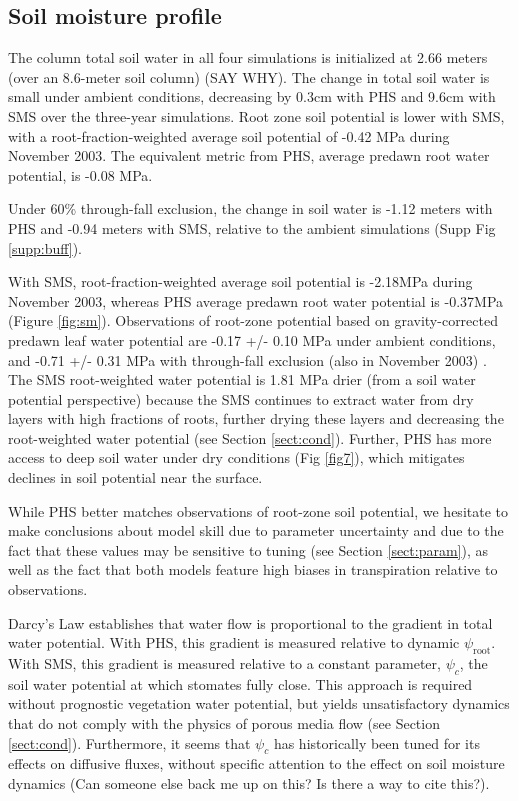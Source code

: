 \documentclass[draft,linenumbers]{agujournal}
\begin{document}
\subsection{Soil moisture profile}

    The column total soil water in all four simulations is initialized at 2.66 meters (over an 8.6-meter soil column) (SAY WHY). The change in total soil water is small under ambient conditions, decreasing by 0.3cm with PHS and 9.6cm with SMS over the three-year simulations. Root zone soil potential is lower with SMS, with a root-fraction-weighted average soil potential of -0.42 MPa during November 2003. The equivalent metric from PHS, average predawn root water potential, is -0.08 MPa. 
    
    Under 60\% through-fall exclusion, the change in soil water is -1.12 meters with PHS and -0.94 meters with SMS, relative to the ambient simulations (Supp Fig \ref{supp:buff}). 
    
    With SMS, root-fraction-weighted average soil potential is -2.18MPa during November 2003, whereas  PHS average predawn root water potential is -0.37MPa (Figure \ref{fig:sm}). Observations of root-zone potential based on gravity-corrected predawn leaf water potential are -0.17 +/- 0.10 MPa under ambient conditions, and -0.71 +/- 0.31 MPa with through-fall exclusion (also in November 2003) \citep{fisher2007}.  The SMS root-weighted water potential is 1.81 MPa drier (from a soil water potential perspective) because the SMS continues to extract water from dry layers with high fractions of roots, further drying these layers and decreasing the root-weighted water potential (see Section \ref{sect:cond}).  Further, PHS has more access to deep soil water under dry conditions (Fig \ref{fig7}), which mitigates declines in soil potential near the surface.
    
    While PHS better matches observations of root-zone soil potential, we hesitate to make conclusions about model skill due to parameter uncertainty and due to the fact that these values may be sensitive to tuning (see Section \ref{sect:param}), as well as the fact that both models feature high biases in transpiration relative to observations.
    
    Darcy's Law establishes that water flow is proportional to the gradient in total water potential. 
    With PHS, this gradient is measured relative to dynamic $\psi_{\text{root}}$.
    With SMS, this gradient is measured relative to a constant parameter, $\psi_c$, the soil water potential at which stomates fully close.
    This approach is required without prognostic vegetation water potential, but yields unsatisfactory dynamics that do not comply with the physics of porous media flow (see Section \ref{sect:cond}).
    Furthermore, it seems that $\psi_c$ has historically been tuned for its effects on diffusive fluxes, without specific attention to the effect on soil moisture dynamics 
    (Can someone else back me up on this? Is there a way to cite this?).
    
\end{document}
